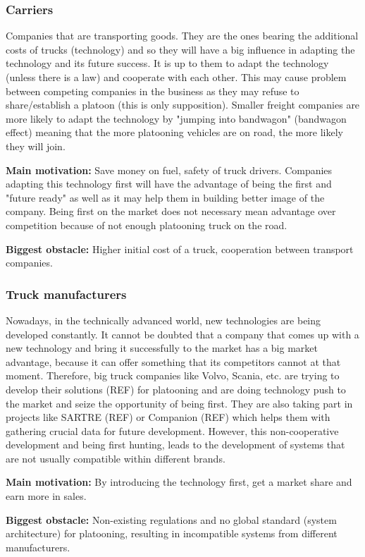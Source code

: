 \subsubsection*{Carriers}
Companies that are transporting goods. They are the ones bearing the additional costs of trucks (technology) and so they will have a big influence in adapting the technology and its future success. It is up to them to adapt the technology (unless there is a law) and cooperate with each other. This may cause problem between competing companies in the business as they may refuse to share/establish a platoon (this is only supposition). Smaller freight companies are more likely to adapt the technology by "jumping into bandwagon" (bandwagon effect) meaning that the more platooning vehicles are on road, the more likely they will join.
% 
\par \textbf{Main motivation:} Save money on fuel, safety of truck drivers. Companies adapting this technology first will have the advantage of being the first and "future ready" as well as it may help them in building better image of the company. Being first on the market does not necessary mean advantage over competition because of not enough platooning truck on the road.
% 
\par \textbf{Biggest obstacle:} Higher initial cost of a truck, cooperation between transport companies.
% 
\subsubsection*{Truck manufacturers}
Nowadays, in the technically advanced world, new technologies are being developed constantly. It cannot be doubted that a company that comes up with a new technology and bring it successfully to the market has a big market advantage, because it can offer something that its competitors cannot at that moment. Therefore, big truck companies like Volvo, Scania, etc. are trying to develop their solutions (REF) for platooning and are doing technology push to the market and seize the opportunity of being first. They are also taking part in projects like SARTRE (REF)  or Companion (REF) which helps them with gathering crucial data for future development. However, this non-cooperative development and being first hunting, leads to the development of systems that are not usually compatible within different brands.\par
% 
\par \textbf{Main motivation:} By introducing the technology first, get a market share and earn more in sales.\par
% 
\par \textbf{Biggest obstacle:} Non-existing regulations and no global standard (system architecture) for platooning, resulting in incompatible systems from different manufacturers.\par
% 
